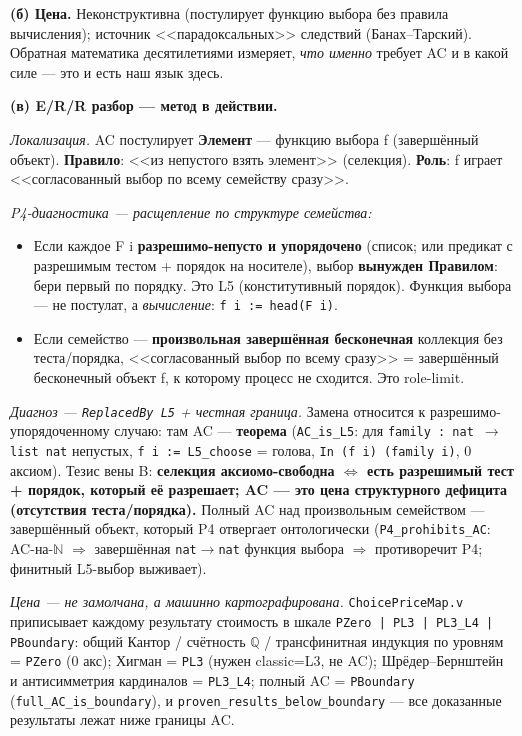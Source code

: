 \documentclass[11pt,a4paper]{article}
\begin{document}
\textbf{(б) Цена.} Неконструктивна (постулирует функцию выбора без правила вычисления); источник <<парадоксальных>> следствий (Банах--Тарский). Обратная математика десятилетиями измеряет, \emph{что именно} требует AC и в какой силе --- это и есть наш язык здесь.

\textbf{(в) E/R/R разбор --- метод в действии.}

\emph{Локализация.} AC постулирует \textbf{Элемент} --- функцию выбора f (завершённый объект). \textbf{Правило}: <<из непустого взять элемент>> (селекция). \textbf{Роль}: f играет <<согласованный выбор по всему семейству сразу>>.

\emph{P4-диагностика --- расщепление по структуре семейства:}
\begin{itemize}
\item Если каждое F i \textbf{разрешимо-непусто и упорядочено} (список; или предикат с разрешимым тестом + порядок на носителе), выбор \textbf{вынужден Правилом}: бери первый по порядку. Это L5 (конститутивный порядок). Функция выбора --- не постулат, а \emph{вычисление}: \texttt{f i := head(F i)}.
\item Если семейство --- \textbf{произвольная завершённая бесконечная} коллекция без теста/порядка, <<согласованный выбор по всему сразу>> = завершённый бесконечный объект f, к которому процесс не сходится. Это role-limit.
\end{itemize}

\emph{Диагноз --- \texttt{Replaced\allowbreak{}By L5} + честная граница.} Замена относится к разрешимо-упорядоченному случаю: там AC --- \textbf{теорема} (\texttt{AC\_\allowbreak{}is\_\allowbreak{}L5}: для \texttt{family : nat $\to$ list nat} непустых, \texttt{f i := L5\_\allowbreak{}choose} = голова, \texttt{In (f i) (family i)}, 0 аксиом). Тезис вены B: \textbf{селекция аксиомо-свободна $\Longleftrightarrow$ есть разрешимый тест + порядок, который её разрешает; AC --- это цена структурного дефицита (отсутствия теста/порядка).} Полный AC над произвольным семейством --- завершённый объект, который P4 отвергает онтологически (\texttt{P4\_\allowbreak{}prohibits\_\allowbreak{}AC}: AC-на-$\mathbb{N}$ $\Longrightarrow$ завершённая \texttt{nat$\to$nat} функция выбора $\Longrightarrow$ противоречит P4; финитный L5-выбор выживает).

\emph{Цена --- не замолчана, а машинно картографирована.} \texttt{Choice\allowbreak{}Price\allowbreak{}Map.v} приписывает каждому результату стоимость в шкале \texttt{PZero | PL3 | PL3\_\allowbreak{}L4 | PBoundary}: общий Кантор / счётность $\mathbb{Q}$ / трансфинитная индукция по уровням = \texttt{PZero} (0 акс); Хигман = \texttt{PL3} (нужен classic=L3, не AC); Шрёдер--Бернштейн и антисимметрия кардиналов = \texttt{PL3\_\allowbreak{}L4}; полный AC = \texttt{PBoundary} (\texttt{full\_\allowbreak{}AC\_\allowbreak{}is\_\allowbreak{}boundary}), и \texttt{proven\_\allowbreak{}results\_\allowbreak{}below\_\allowbreak{}boundary} --- все доказанные результаты лежат ниже границы AC.
\end{document}

